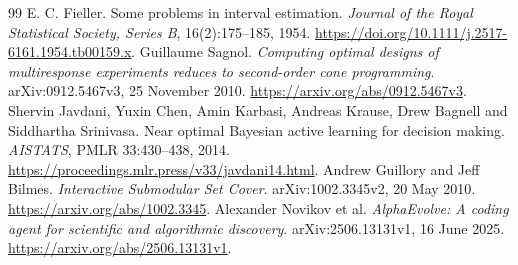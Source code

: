\documentclass[11pt,letterpaper]{article}
\theoremstyle{definition}\newtheorem{definition}[theorem]{Definition}
\theoremstyle{remark}\newtheorem{remark}[theorem]{Remark}
\begin{document}
\begin{thebibliography}{99}
 E. C. Fieller. Some problems in interval estimation. \emph{Journal of the Royal Statistical Society, Series B}, 16(2):175--185, 1954. \url{https://doi.org/10.1111/j.2517-6161.1954.tb00159.x}.
 Guillaume Sagnol. \emph{Computing optimal designs of multiresponse experiments reduces to second-order cone programming}. arXiv:0912.5467v3, 25 November 2010. \url{https://arxiv.org/abs/0912.5467v3}.
 Shervin Javdani, Yuxin Chen, Amin Karbasi, Andreas Krause, Drew Bagnell and Siddhartha Srinivasa. Near optimal Bayesian active learning for decision making. \emph{AISTATS}, PMLR 33:430--438, 2014. \url{https://proceedings.mlr.press/v33/javdani14.html}.
 Andrew Guillory and Jeff Bilmes. \emph{Interactive Submodular Set Cover}. arXiv:1002.3345v2, 20 May 2010. \url{https://arxiv.org/abs/1002.3345}.
 Alexander Novikov et al. \emph{AlphaEvolve: A coding agent for scientific and algorithmic discovery}. arXiv:2506.13131v1, 16 June 2025. \url{https://arxiv.org/abs/2506.13131v1}.
\end{thebibliography}
\end{document}
